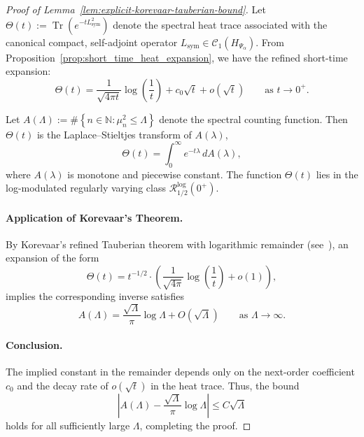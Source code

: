 \begin{proof}[Proof of Lemma~\ref{lem:explicit-korevaar-tauberian-bound}]
Let \( \Theta(t) := \operatorname{Tr}(e^{-t L_{\mathrm{sym}}^2}) \) denote the spectral heat trace associated with the canonical compact, self-adjoint operator \( L_{\mathrm{sym}} \in \mathcal{C}_1(H_{\Psi_\alpha}) \). From Proposition~\ref{prop:short_time_heat_expansion}, we have the refined short-time expansion:
\[
\Theta(t) = \frac{1}{\sqrt{4\pi t}} \log\left( \frac{1}{t} \right) + c_0 \sqrt{t} + o(\sqrt{t}) \qquad \text{as } t \to 0^+.
\]

Let \( A(\Lambda) := \#\left\{ n \in \mathbb{N} : \mu_n^2 \le \Lambda \right\} \) denote the spectral counting function. Then \( \Theta(t) \) is the Laplace–Stieltjes transform of \( A(\lambda) \),
\[
\Theta(t) = \int_0^\infty e^{-t \lambda} \, dA(\lambda),
\]
where \( A(\lambda) \) is monotone and piecewise constant. The function \( \Theta(t) \) lies in the log-modulated regularly varying class \( \mathcal{R}_{1/2}^{\log}(0^+) \).

\paragraph{Application of Korevaar’s Theorem.}
By Korevaar’s refined Tauberian theorem with logarithmic remainder (see~\cite[Ch.~III, Thm.~5.5]{Korevaar2004Tauberian}), an expansion of the form
\[
\Theta(t) = t^{-1/2} \cdot \left( \frac{1}{\sqrt{4\pi}} \log\left( \frac{1}{t} \right) + o(1) \right),
\]
implies the corresponding inverse satisfies
\[
A(\Lambda) = \frac{\sqrt{\Lambda}}{\pi} \log \Lambda + O(\sqrt{\Lambda}) \qquad \text{as } \Lambda \to \infty.
\]

\paragraph{Conclusion.}
The implied constant in the remainder depends only on the next-order coefficient \( c_0 \) and the decay rate of \( o(\sqrt{t}) \) in the heat trace. Thus, the bound
\[
\left| A(\Lambda) - \frac{\sqrt{\Lambda}}{\pi} \log \Lambda \right| \le C \sqrt{\Lambda}
\]
holds for all sufficiently large \( \Lambda \), completing the proof.
\end{proof}

